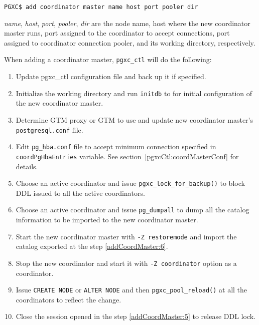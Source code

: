   \begin{lstlisting}[frame=single]
PGXC$ add coordinator master name host port pooler dir
  \end{lstlisting}
  
  {\it name}, {\it host}, {\it port}, {\it pooler}, {\it dir} are
  the node name,
  host where the new coordinator master runs,
  port assigned to the coordinator to accept connections,
  port assigned to coordinator connection pooler,
  and its working directory, respectively.
  
  When adding a coordinator master, \verb|pgxc_ctl| will do the following:
  
  \begin{enumerate}
	  \item Update pgxc\_ctl configuration file and back up it if specified.
	  \item Initialize the working directory and run \verb|initdb| to for initial configuration of
	  		the new coordinator master.
	  \item Determine GTM proxy or GTM to use and update new coordinator master's
	  		\verb|postgresql.conf| file.
	  \item Edit \verb|pg_hba.conf| file to accept minimum connection specified in
	  		\verb|coordPgHbaEntries| variable.  See section~\ref{pgxcCtl:coordMasterConf}
			for details.
	  \item \label{addCoordMaster:5}Choose an active coordinator and issue
	  		\verb|pgxc_lock_for_backup()| to block DDL issued to all the active
			coordinators.
	  \item \label{addCoordMaster:6}Choose an active coordinator and issue \verb|pg_dumpall|
	  		to dump all the catalog information to be imported to the new coordinator master.
	  \item Start the new coordinator master with \verb|-Z restoremode| and import the catalog
	  		exported at the step \ref{addCoordMaster:6}.
	  \item Stop the new coordinator and start it with \verb|-Z coordinator| option as a coordinator.
	  \item Issue \verb|CREATE NODE| or \verb|ALTER NODE| and then \verb|pgxc_pool_reload()| at
	  		all the coordinators to reflect the change.
	  \item Close the session opened in the step \ref{addCoordMaster:5} to release DDL lock.
  \end{enumerate}


